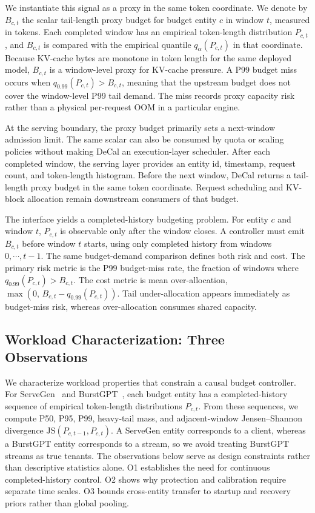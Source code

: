 \documentclass[sigplan,10pt, anonymous]{acmart}
\begin{document}
We instantiate this signal as a proxy in the same token coordinate. We denote by $B_{c,t}$ the scalar tail-length proxy budget for budget entity $c$ in window $t$, measured in tokens. Each completed window has an empirical token-length distribution $P_{c,t}$, and $B_{c,t}$ is compared with the empirical quantile $q_\alpha(P_{c,t})$ in that coordinate. Because KV-cache bytes are monotone in token length for the same deployed model, $B_{c,t}$ is a window-level proxy for KV-cache pressure. A P99 budget miss occurs when $q_{0.99}(P_{c,t}) > B_{c,t}$, meaning that the upstream budget does not cover the window-level P99 tail demand. The miss records proxy capacity risk rather than a physical per-request OOM in a particular engine.

At the serving boundary, the proxy budget primarily sets a next-window admission limit. The same scalar can also be consumed by quota or scaling policies without making DeCal an execution-layer scheduler. After each completed window, the serving layer provides an entity id, timestamp, request count, and token-length histogram. Before the next window, DeCal returns a tail-length proxy budget in the same token coordinate. Request scheduling and KV-block allocation remain downstream consumers of that budget.

The interface yields a completed-history budgeting problem. For entity $c$ and window $t$, $P_{c,t}$ is observable only after the window closes. A controller must emit $B_{c,t}$ before window $t$ starts, using only completed history from windows $0,\cdots,t{-}1$. The same budget-demand comparison defines both risk and cost. The primary risk metric is the P99 budget-miss rate, the fraction of windows where $q_{0.99}(P_{c,t}) > B_{c,t}$. The cost metric is mean over-allocation, $\max(0,\,B_{c,t}-q_{0.99}(P_{c,t}))$. Tail under-allocation appears immediately as budget-miss risk, whereas over-allocation consumes shared capacity.


\subsection{Workload Characterization: Three Observations}
\label{sec:workload-characterization}

We characterize workload properties that constrain a causal budget controller. For ServeGen~\cite{Xiang2026NSDI} and BurstGPT~\cite{Wang2025KDD}, each budget entity has a completed-history sequence of empirical token-length distributions $P_{c,t}$. From these sequences, we compute P50, P95, P99, heavy-tail mass, and adjacent-window Jensen--Shannon divergence $\mathrm{JS}(P_{c,t-1},P_{c,t})$. A ServeGen entity corresponds to a client, whereas a BurstGPT entity corresponds to a stream, so we avoid treating BurstGPT streams as true tenants. The observations below serve as design constraints rather than descriptive statistics alone. O1 establishes the need for continuous completed-history control. O2 shows why protection and calibration require separate time scales. O3 bounds cross-entity transfer to startup and recovery priors rather than global pooling.
\end{document}
